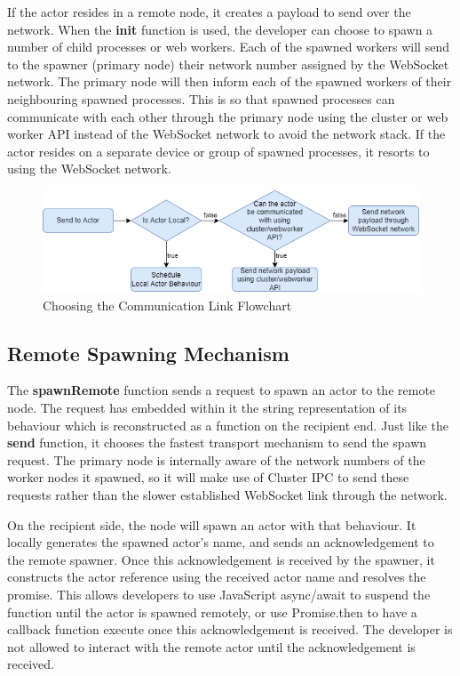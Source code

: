 \documentclass[12pt, a4paper]{report}
\theoremstyle{definition}
\theoremstyle{definition}%
\theoremstyle{definition}%
\theoremstyle{definition}%
\theoremstyle{definition}%
\theoremstyle{definition}%
\begin{document}
If the actor resides in a remote node, it creates a payload to send over the network. When the \textbf{init} function is used, the developer can choose to spawn a number of child processes or web workers. Each of the spawned workers will send to the spawner (primary node) their network number assigned by the WebSocket network. The primary node will then inform each of the spawned workers of their neighbouring spawned processes. This is so that spawned processes can communicate with each other through the primary node using the cluster or web worker API instead of the WebSocket network to avoid the network stack. If the actor resides on a separate device or group of spawned processes, it resorts to using the WebSocket network.
\begin{figure}[H]
    \begin{centering}
        \includegraphics[width=\textwidth]{resources/communication.png}
        \caption{Choosing the Communication Link Flowchart}
    \end{centering}
\end{figure}

\subsection{Remote Spawning Mechanism}
The \textbf{spawnRemote} function sends a request to spawn an actor to the remote node. The request has embedded within it the string representation of its behaviour which is reconstructed as a function on the recipient end. Just like the \textbf{send} function, it chooses the fastest transport mechanism to send the spawn request. The primary node is internally aware of the network numbers of the worker nodes it spawned, so it will make use of Cluster IPC to send these requests rather than the slower established WebSocket link through the network.

On the recipient side, the node will spawn an actor with that behaviour. It locally generates the spawned actor's name, and sends an acknowledgement to the remote spawner. Once this acknowledgement is received by the spawner, it constructs the actor reference using the received actor name and resolves the promise. This allows developers to use JavaScript async/await to suspend the function until the actor is spawned remotely, or use Promise.then to have a callback function execute once this acknowledgement is received. The developer is not allowed to interact with the remote actor until the acknowledgement is received. 
\end{document}
